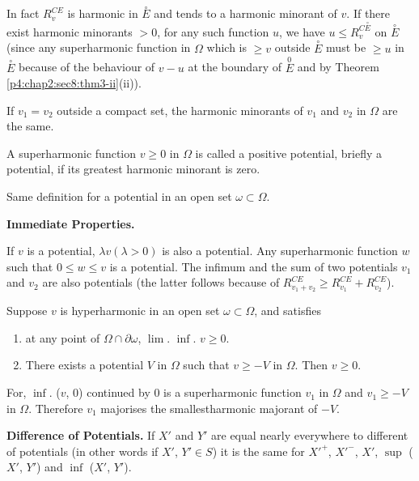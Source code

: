 In fact $R^{CE}_v$ is harmonic in $\overset{\circ}E$ and tends to a
harmonic minorant of $v$. If there exist harmonic minorants $> 0$, for
any such function $u$, we have $u \le R^{C \overset{\circ}E}_v$ on
$\overset{\circ}E$ (since any superharmonic function in $\Omega$ which is
$\ge v$ outside $\overset{\circ}E$ must be $\ge u $ in $\overset{\circ}E$
because of the behaviour of $v-u$ at the boundary of $\overset{0}E
$ and by Theorem \ref{p4:chap2:sec8:thm3-ii}(ii)).  

\begin{remark*}
  If $v_1 = v_2$ outside a compact set, the harmonic minorants of
  $v_1$ and $v_2$ in $\Omega$ are the same. 
\end{remark*}

\begin{defn}\label{p4:chap4:sec20:def14} %
  A superharmonic function $v \ge 0$ in $\Omega$ is called a positive
  potential, briefly a potential, if its greatest harmonic minorant is
  zero. 
\end{defn}

Same definition for a potential in an open set $\omega \subset \Omega$.

\noindent
\textbf{Immediate Properties.}

If $v$ is a potential, $\lambda v (\lambda > 0)$ is also a potential. Any
superharmonic function $w$ such that $0 \le w \le v$ is a
potential. The infimum and the sum of two potentials $v_1$ and $v_2$
are also potentials (the latter follows because of $R^{CE}_{v_1 + v_2}
\ge R^{CE}_{v_1} + R^{CE}_{v_2}$). 

\begin{prop}\label{p4:chap4:sec20:prop9} %
  Suppose $v$ is hyperharmonic in an open set $\omega \subset \Omega$,
  and satisfies 
  \begin{enumerate}[\rm (i)]
  \item at any point of $\Omega \cap \partial \omega$,
    $\lim$. $\inf$. $v \ge 0$. 
  \item There exists a potential $V$ in $\Omega$ such that $v \ge - V$
    in $\Omega$. Then $v \ge 0$. 
  \end{enumerate}
\end{prop}	

For, $\inf$. ($v$, $0$) continued by $0$ is a superharmonic function
$v_1$ in $\Omega$ and $v_1 \ge - V$ in $\Omega$. Therefore $v_1$
majorises the smallest\pageoriginale harmonic majorant of $-V$. 

\noindent
\textbf{Difference of Potentials.}
If $X'$ and $Y'$ are equal nearly everywhere to different of
potentials (in other words if $X'$, $Y' \in S$) it is the same for
$X'^{+}$, $X'^{-}$, $X'$, $\sup$ ($X'$, $Y'$) and $\inf$ ($X'$, $Y'$). 

